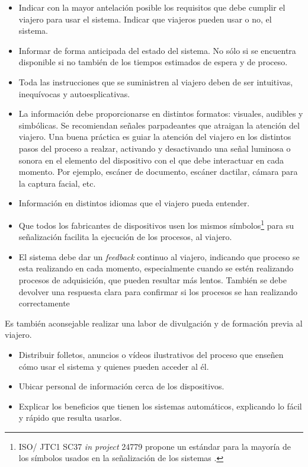 \begin{itemize}
    \item
    Indicar con la mayor antelación posible los requisitos que debe cumplir el viajero para usar el sistema. Indicar que viajeros pueden usar o no, el sistema.  
    \item
    Informar de forma anticipada del estado del sistema. No sólo si se encuentra disponible si no también de los tiempos estimados de espera y de proceso.
    \item
    Toda las instrucciones que se suministren al viajero deben de ser intuitivas, inequívocas y autoesplicativas.
    \item
    La información debe proporcionarse en distintos formatos: visuales, audibles y simbólicas. Se recomiendan señales parpadeantes que atraigan la atención del viajero.
    Una buena práctica es guiar la atención del viajero en los distintos pasos del proceso a realzar, activando y desactivando una señal luminosa o sonora en el elemento del dispositivo con el que debe interactuar en cada momento. Por ejemplo, escáner de documento, escáner dactilar, cámara para la captura \gls{facial}, etc.
    \item
    Información en distintos idiomas que el viajero pueda entender.
    \item
    Que todos los fabricantes de dispositivos  usen los mismos símbolos\footnote{ISO/ JTC1 SC37 \textit{in project} 24779 \cite{ISO/Biometric} propone un estándar para la mayoría de los símbolos usados en la  señalización de los sistemas .} para su señalización facilita la ejecución de los procesos, al viajero.
    \item
    El sistema debe dar un \textit{feedback} continuo al viajero, indicando que proceso se esta realizando en cada momento, especialmente cuando se estén realizando procesos de adquisición, que pueden resultar más lentos. También se debe devolver una respuesta clara para confirmar si los procesos se han realizando correctamente
\end{itemize}

Es también aconsejable realizar una labor de divulgación y de formación previa al viajero.

\begin{itemize}
    \item
    Distribuir folletos, anuncios o vídeos ilustrativos del proceso que enseñen cómo usar el sistema y quienes pueden acceder al él. 
    \item
    Ubicar personal de información cerca de los dispositivos. 
    \item
    Explicar los beneficios que tienen los sistemas automáticos, explicando lo fácil y rápido que resulta usarlos.
\end{itemize}

